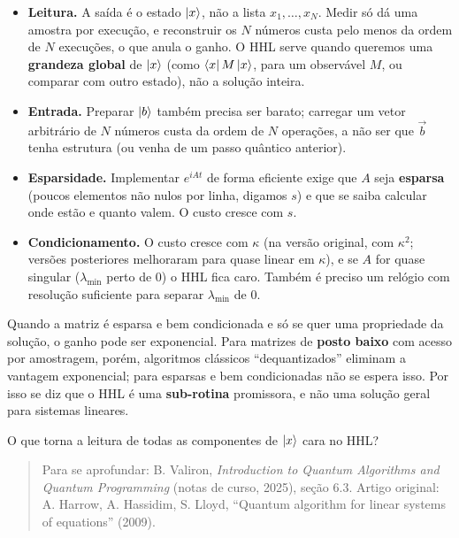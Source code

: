 \begin{itemize}
\tightlist
\item
  \textbf{Leitura.} A saída é o estado \(\left|{x}\right>\), não a lista \(x_1,\dots,x_N\). Medir só dá uma amostra por execução, e reconstruir os \(N\) números custa pelo menos da ordem de \(N\) execuções, o que anula o ganho. O HHL serve quando queremos uma \textbf{grandeza global} de \(\left|{x}\right>\) (como \(\left<{x}\right| M\left|{x}\right>\), para um observável \(M\), ou comparar com outro estado), não a solução inteira.
\item
  \textbf{Entrada.} Preparar \(\left|{b}\right>\) também precisa ser barato; carregar um vetor arbitrário de \(N\) números custa da ordem de \(N\) operações, a não ser que \(\vec b\) tenha estrutura (ou venha de um passo quântico anterior).
\item
  \textbf{Esparsidade.} Implementar \(e^{iAt}\) de forma eficiente exige que \(A\) seja \textbf{esparsa} (poucos elementos não nulos por linha, digamos \(s\)) e que se saiba calcular onde estão e quanto valem. O custo cresce com \(s\).
\item
  \textbf{Condicionamento.} O custo cresce com \(\kappa\) (na versão original, com \(\kappa^2\); versões posteriores melhoraram para quase linear em \(\kappa\)), e se \(A\) for quase singular (\(\lambda_{\min}\) perto de 0) o HHL fica caro. Também é preciso um relógio com resolução suficiente para separar \(\lambda_{\min}\) de 0.
\end{itemize}

Quando a matriz é esparsa e bem condicionada e só se quer uma propriedade da solução, o ganho pode ser exponencial. Para matrizes de \textbf{posto baixo} com acesso por amostragem, porém, algoritmos clássicos ``dequantizados'' eliminam a vantagem exponencial; para esparsas e bem condicionadas não se espera isso. Por isso se diz que o HHL é uma \textbf{sub-rotina} promissora, e não uma solução geral para sistemas lineares.

O que torna a leitura de todas as componentes de \(\left|{x}\right>\) cara no HHL?

\begin{quote}
Para se aprofundar: B. Valiron, \emph{Introduction to Quantum Algorithms and Quantum Programming} (notas de curso, 2025), seção 6.3. Artigo original: A. Harrow, A. Hassidim, S. Lloyd, ``Quantum algorithm for linear systems of equations'' (2009).
\end{quote}

